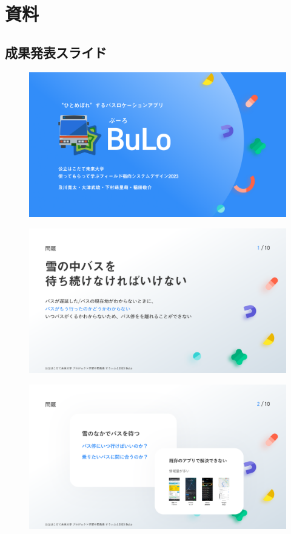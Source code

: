 \chapter{資料}
\section{成果発表スライド}
\begin{figure}[H]
    \centering
    \includegraphics[width=14cm]{images/slide0.png}
    \label{fig:slide0}
\end{figure}
\begin{figure}[H]
    \includegraphics[width=14cm]{images/slide1.png}
    \label{fig:slide1}
\end{figure}
\begin{figure}[H]
    \includegraphics[width=14cm]{images/slide2.png}
    \label{fig:slide2}
\end{figure}
